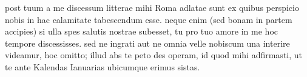 


 post tuum a me discessum litterae mihi Roma adlatae sunt ex quibus perspicio nobis in hac calamitate tabescendum esse. neque enim (sed bonam in partem accipies) si ulla spes salutis nostrae subesset, tu pro tuo amore in me hoc tempore discessisses. sed ne ingrati aut ne omnia velle nobiscum una interire videamur, hoc omitto; illud abs te peto des operam, id quod mihi adfirmasti, ut te ante Kalendas Ianuarias ubicumque erimus sistas.
